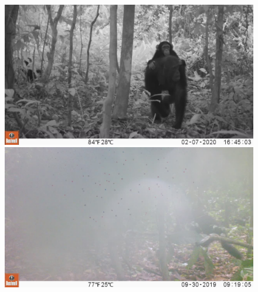\begin{figure}[htbp]
    \begin{minipage}[t]{0.48\textwidth}
        \centering
        \includegraphics[width=\linewidth]{body/experimental/assets/detection_frames/frame3}
    \end{minipage}
    \begin{minipage}[t]{0.48\textwidth}
        \centering
        \includegraphics[width=\linewidth]{body/experimental/assets/detection_frames/frame4}
    \end{minipage}


\end{figure}
